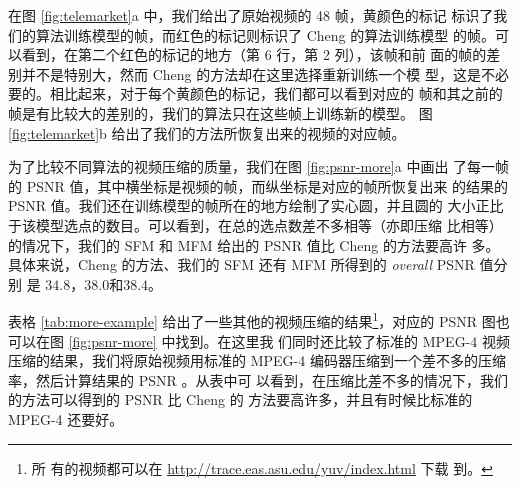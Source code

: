 在图 \ref{fig:telemarket}a 中，我们给出了原始视频的 48 帧，黄颜色的标记
标识了我们的算法训练模型的帧，而红色的标记则标识了 Cheng 的算法训练模型
的帧。可以看到，在第二个红色的标记的地方（第 6 行，第 2 列），该帧和前
面的帧的差别并不是特别大，然而 Cheng 的方法却在这里选择重新训练一个模
型，这是不必要的。相比起来，对于每个黄颜色的标记，我们都可以看到对应的
帧和其之前的帧是有比较大的差别的，我们的算法只在这些帧上训练新的模型。
图 \ref{fig:telemarket}b 给出了我们的方法所恢复出来的视频的对应帧。

为了比较不同算法的视频压缩的质量，我们在图 \ref{fig:psnr-more}a 中画出
了每一帧的 PSNR 值，其中横坐标是视频的帧，而纵坐标是对应的帧所恢复出来
的结果的 PSNR 值。我们还在训练模型的帧所在的地方绘制了实心圆，并且圆的
大小正比于该模型选点的数目。可以看到，在总的选点数差不多相等（亦即压缩
比相等）的情况下，我们的 SFM 和 MFM 给出的 PSNR 值比 Cheng 的方法要高许
多。具体来说，Cheng 的方法、我们的 SFM 还有 MFM 所得到的 {\em overall}
PSNR \cite{wavelet-based-rate-scalable-video-compression}值分别
是 $34.8$，$38.0$和$38.4$。

表格 \ref{tab:more-example} 给出了一些其他的视频压缩的结果\footnote{所
  有的视频都可以在 \url{http://trace.eas.asu.edu/yuv/index.html} 下载
  到。}，对应的 PSNR 图也可以在图 \ref{fig:psnr-more} 中找到。在这里我
们同时还比较了标准的 MPEG-4 视频压缩的结果，我们将原始视频用标准的
MPEG-4 编码器压缩到一个差不多的压缩率，然后计算结果的 PSNR 。从表中可
以看到，在压缩比差不多的情况下，我们的方法可以得到的 PSNR 比 Cheng 的
方法要高许多，并且有时候比标准的 MPEG-4 还要好。

